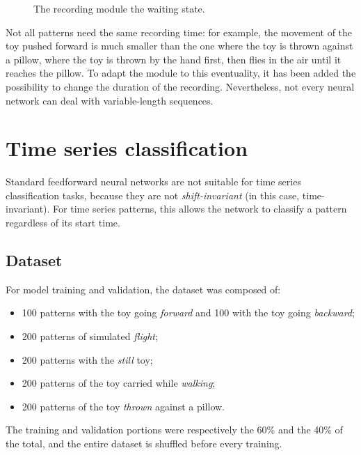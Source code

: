 \begin{center}
	\begin{figure}[ht]
		\caption{The recording module the waiting state.}
	\end{figure}
\end{center}
Not all patterns need the same recording time: for example, the movement of the toy pushed forward is much smaller than the one where the toy is thrown against a pillow, where the toy is thrown by the hand first, then flies in the air until it reaches the pillow. To adapt the module to this eventuality, it has been added the possibility to change the duration of the recording. Nevertheless, not every neural network can deal with variable-length sequences.

\section{Time series classification}
Standard feedforward neural networks are not suitable for time series classification tasks, because they are not \textit{shift-invariant} (in this case, time-invariant). For time series patterns, this allows the network to classify a pattern regardless of its start time.

\subsection{Dataset}
For model training and validation, the dataset was composed of:
\begin{itemize}
	\item 100 patterns with the toy going \textit{forward} and 100 with the toy going \textit{backward};
	\item 200 patterns of simulated \textit{flight};
	\item 200 patterns with the \textit{still} toy;
	\item 200 patterns of the toy carried while \textit{walking};
	\item 200 patterns of the toy \textit{thrown} against a pillow.
\end{itemize}
The training and validation portions were respectively the 60\% and the 40\% of the total, and the entire dataset is shuffled before every training.

